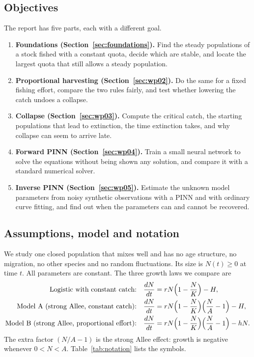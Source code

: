 \subsection{Objectives}
The report has five parts, each with a different goal.
\begin{enumerate}
\item \textbf{Foundations (Section~\ref{sec:foundations}).} Find the steady populations of a stock fished with a constant quota, decide which are stable, and locate the largest quota that still allows a steady population.
\item \textbf{Proportional harvesting (Section~\ref{sec:wp02}).} Do the same for a fixed fishing effort, compare the two rules fairly, and test whether lowering the catch undoes a collapse.
\item \textbf{Collapse (Section~\ref{sec:wp03}).} Compute the critical catch, the starting populations that lead to extinction, the time extinction takes, and why collapse can seem to arrive late.
\item \textbf{Forward PINN (Section~\ref{sec:wp04}).} Train a small neural network to solve the equations without being shown any solution, and compare it with a standard numerical solver.
\item \textbf{Inverse PINN (Section~\ref{sec:wp05}).} Estimate the unknown model parameters from noisy synthetic observations with a PINN and with ordinary curve fitting, and find out when the parameters can and cannot be recovered.
\end{enumerate}

\subsection{Assumptions, model and notation}
\label{sec:model-definitions}
We study one closed population that mixes well and has no age structure, no migration, no other species and no random fluctuations. Its size is $N(t)\ge 0$ at time $t$. All parameters are constant. The three growth laws we compare are
\begin{align}
\text{Logistic with constant catch:}\quad & \frac{dN}{dt}=rN\Bigl(1-\frac{N}{K}\Bigr)-H, \label{eq:logistic}\\
\text{Model A (strong Allee, constant catch):}\quad & \frac{dN}{dt}=rN\Bigl(1-\frac{N}{K}\Bigr)\Bigl(\frac{N}{A}-1\Bigr)-H, \label{eq:modelA}\\
\text{Model B (strong Allee, proportional effort):}\quad & \frac{dN}{dt}=rN\Bigl(1-\frac{N}{K}\Bigr)\Bigl(\frac{N}{A}-1\Bigr)-hN. \label{eq:modelB}
\end{align}
The extra factor $(N/A-1)$ is the strong Allee effect: growth is negative whenever $0<N<A$. Table~\ref{tab:notation} lists the symbols.

